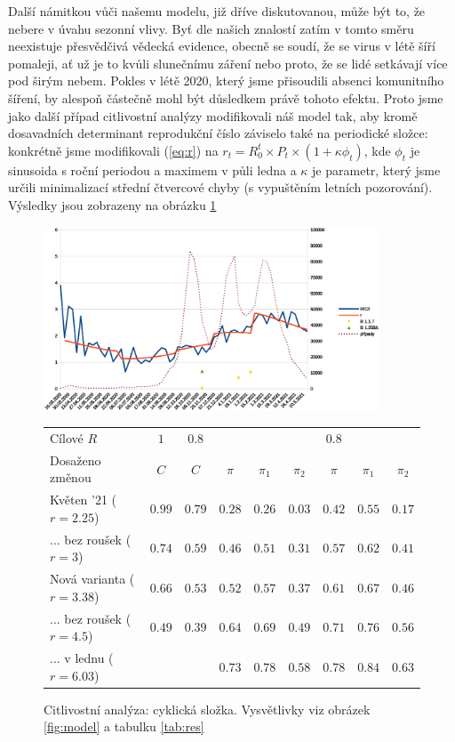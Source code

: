 Další námitkou vůči našemu modelu, již dříve diskutovanou, může být to, že nebere v úvahu sezonní
vlivy. Byť dle našich znalostí zatím v tomto směru neexistuje přesvědčivá vědecká
evidence, obecně se soudí, že se virus v létě šíří pomaleji, ať už
je to kvůli slunečnímu záření nebo proto, že se lidé setkávají více
pod širým nebem. Pokles v létě 2020, který jsme přisoudili absenci
komunitního šíření, by alespoň částečně mohl být důsledkem právě tohoto
efektu. Proto jsme jako další případ citlivostní analýzy modifikovali
náš model tak, aby kromě dosavadních determinant reprodukční číslo záviselo
také na periodické složce: konkrétně jsme modifikovali (\ref{eq:r}) na 
$r_{t}=R_{0}^{t}\times P_{t}\times(1+\kappa\phi_{t})$, kde $\phi_{t}$
je sinusoida s roční periodou a maximem v půli ledna a $\kappa$ je
parametr, který jsme určili minimalizací střední čtvercové chyby (s
vypuštěním letních pozorování). Výsledky jsou zobrazeny na obrázku \ref{fig:cc}

\begin{figure}

\begin{center}

\includegraphics[width=10cm]{pic/wholec} 

\begin{tabular}{l|c|c|ccc|ccc}									
Cílové $R$	& $1$	& $0.8$	&	&	&	& $0.8$	&	&	\\ 
Dosaženo změnou	& $C$	& $C$	& $\pi$	& $\pi_1$	& $\pi_2$	& $\pi$	& $\pi_1$	& $\pi_2$	\\ \hline
Květen '21 ($r=2.25$)	& $0.99$	& $0.79$	& $0.28$	& $0.26$	& $0.03$	& $0.42$	& $0.55$	& $0.17$	\\
... bez roušek ($r=3$)	& $0.74$	& $0.59$	& $0.46$	& $0.51$	& $0.31$	& $0.57$	& $0.62$	& $0.41$	\\
Nová varianta ($r=3.38$)	& $0.66$	& $0.53$	& $0.52$	& $0.57$	& $0.37$	& $0.61$	& $0.67$	& $0.46$	\\
... bez roušek ($r=4.5$)	& $0.49$	& $0.39$	& $0.64$	& $0.69$	& $0.49$	& $0.71$	& $0.76$	& $0.56$	\\
... v lednu ($r=6.03$)	&	&	& $0.73$	& $0.78$	& $0.58$	& $0.78$	& $0.84$	& $0.63$	\\
\end{tabular}									


\caption{Citlivostní analýza: cyklická složka. Vysvětlivky viz obrázek \ref{fig:model} a tabulku \ref{tab:res}}
\label{fig:cc}
\end{center}

\end{figure}


